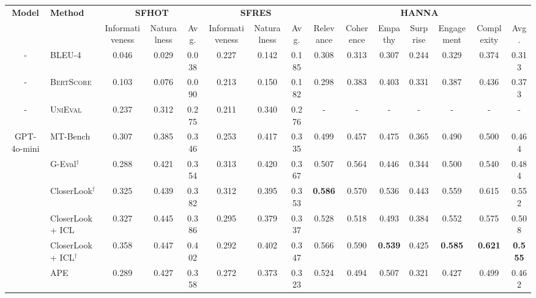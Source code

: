 
\begin{table*} [!t]
\centering
\resizebox{\linewidth}{!} {
\begin{tabular}{cl|ccc|ccc|ccccccc}
\toprule
 \multirow{2}{*}{\textbf{Model}} & \multirow{2}{*}{\textbf{Method}} & \multicolumn{3}{c|}{\textbf{SFHOT}}  & \multicolumn{3}{c|}{\textbf{SFRES}} & \multicolumn{7}{c}{\textbf{HANNA}} \\
\cmidrule{3-15}
  &  & Informativeness & Naturalness & Avg. & Informativeness & Naturalness & Avg. & Relevance & Coherence & Empathy & Surprise & Engagement & Complexity & Avg. \\
\midrule
 - & BLEU-4 & 0.046 & 0.029 & \cellcolor{c1}0.038 & 0.227 & 0.142 & \cellcolor{c2}0.185 & 0.308 & 0.313 & 0.307 & 0.244 & 0.329 & 0.374 & \cellcolor{c3}0.313   \\
 - & \textsc{BertScore}  & 0.103 & 0.076 & \cellcolor{c1}0.090 & 0.213 & 0.150 & \cellcolor{c2}0.182 & 0.298 & 0.383 & 0.403 & 0.331 & 0.387 & 0.436 & \cellcolor{c3}0.373   \\
 - & \textsc{UniEval} & 0.237 & 0.312 & \cellcolor{c1}0.275 & 0.211 & 0.340 & \cellcolor{c2}0.276 & - & - & - & - & - & - & \cellcolor{c3}-   \\
\midrule
\multirow{10}{*}{GPT-4o-mini} & MT-Bench  & 0.307 & 0.385 & \cellcolor{c1}0.346 & 0.253 & 0.417 & \cellcolor{c2}0.335 & 0.499 & 0.457 & 0.475 & 0.365 & 0.490 & 0.500 & \cellcolor{c3}0.464   \\
\cmidrule{2-15} 
 & G-Eval$^{\dag}$  & 0.288 & 0.421 & \cellcolor{c1}0.354 & 0.313 & 0.420 & \cellcolor{c2}0.367 & 0.507 & 0.564 & 0.446 & 0.344 & 0.500 & 0.540 & \cellcolor{c3}0.484 \\
 & CloserLook$^{\dag}$ & 0.325 & 0.439 & \cellcolor{c1}0.382 & 0.312 & 0.395 & \cellcolor{c2}0.353 & \textbf{0.586} & 0.570 & 0.536 & 0.443 & 0.559 & 0.615 & \cellcolor{c3}0.552 \\
& CloserLook + ICL  & 0.327 & 0.445 & \cellcolor{c1}0.386 & 0.295 & 0.379 & \cellcolor{c2}0.337 & 0.528 & 0.518 & 0.493 & 0.384 & 0.552 & 0.575 & \cellcolor{c3}0.508 \\
& CloserLook + ICL$^{\dag}$  & 0.358 & 0.447 & \cellcolor{c1}0.402 & 0.292 & 0.402 & \cellcolor{c2}0.347 & 0.566 & 0.590 & \textbf{0.539} & 0.425 & \textbf{0.585} & \textbf{0.621} & \cellcolor{c3}\textbf{0.555} \\
\cmidrule{2-15} 
 & APE  & 0.289 & 0.427 & \cellcolor{c1}0.358 & 0.272 & 0.373 & \cellcolor{c2}0.323 & 0.524 & 0.494 & 0.507 & 0.321 & 0.427 & 0.499 & \cellcolor{c3}0.462 \\

\end{tabular}}
\end{table*}
